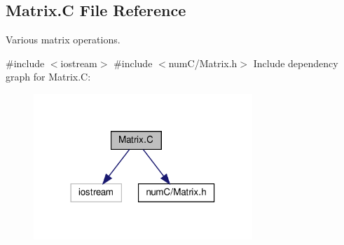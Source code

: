 \hypertarget{Matrix_8C}{}\subsection{Matrix.\+C File Reference}
\label{Matrix_8C}


Various matrix operations.  


{\ttfamily \#include $<$iostream$>$}\newline
{\ttfamily \#include $<$num\+C/\+Matrix.\+h$>$}\newline
Include dependency graph for Matrix.\+C\+:\nopagebreak
\begin{figure}[H]
\begin{center}
\leavevmode
\includegraphics[width=234pt]{Matrix_8C__incl}
\end{center}
\end{figure}
